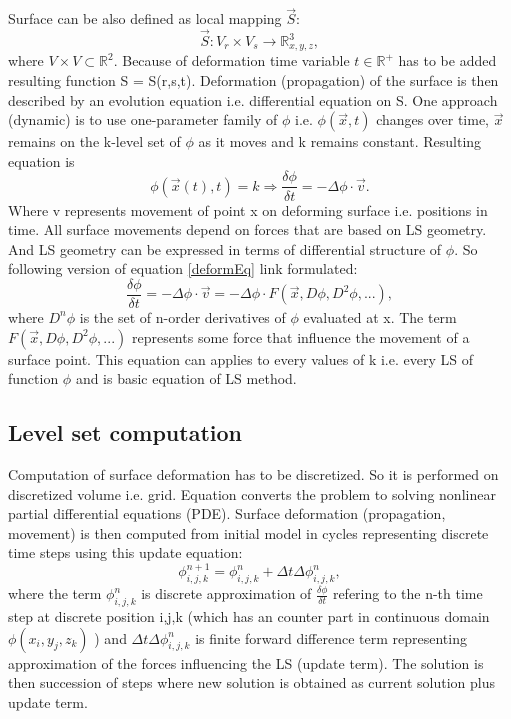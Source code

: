 Surface can be also defined as local mapping $\vec{S}$:
\begin{equation}
\vec{S}: V_r \times V_s \rightarrow \mathbb R^3_{x,y,z},
\end{equation}
where $V \times V \subset \mathbb R^2$. Because of deformation time variable $t\in \mathbb R^+$ has to be added resulting function S = S(r,s,t).
Deformation (propagation) of the surface is then described by an evolution equation i.e. differential equation on S.
One approach (dynamic) is to use one-parameter family of $\phi$ i.e. $\phi(\vec{x},t)$ changes over time, $\vec{x}$ remains on the k-level set of $\phi$ as it moves and k remains constant.
Resulting equation is
\begin{equation}
\label{deformEq}
\phi(\vec{x}(t),t) = k \Rightarrow \frac{\delta \phi}{\delta t} = - \Delta \phi
\cdot \vec{v}.
\end{equation}
Where v represents movement of point x on deforming surface i.e. positions in time.
All surface movements depend on forces that are based on LS geometry.
And LS geometry can be expressed in terms of differential structure of $\phi$.
So following version of equation \ref{deformEq} link formulated:
\begin{equation}
\frac{\delta\phi}{\delta t} = - \Delta \phi \cdot \vec{v} = - \Delta \phi
\cdot F(\vec{x}, D\phi, D^2\phi, ...),
\end{equation}
where $D^n\phi$ is the set of n-order derivatives of $\phi$ evaluated at x.
The term $F(\vec{x}, D\phi, D^2\phi, ...)$ represents some force that influence the movement of a surface point.
This equation can applies to every values of k i.e. every LS of function $\phi$ and is basic equation of LS method.

\subsection{Level set computation}

Computation of surface deformation has to be discretized. So it is performed on discretized volume i.e. grid.
Equation converts the problem to solving nonlinear partial differential equations (PDE).
Surface deformation (propagation, movement) is then computed from initial model in cycles representing discrete time steps using this update equation:
\begin{equation}
\label{deformEqApprox}
\phi_{i,j,k}^{n+1} = \phi_{i,j,k}^{n} + \Delta t \Delta \phi_{i,j,k}^{n},
\end{equation}
where the term $\phi_{i,j,k}^{n}$ is discrete approximation of $\frac{\delta\phi}{\delta t}$ refering to the n-th time step at discrete position i,j,k (which has an counter part in continuous domain $\phi(x_i, y_j, z_k)$ ) and $\Delta t \Delta \phi_{i,j,k}^{n}$ is finite forward difference term representing approximation of the forces influencing the LS (update term). The solution is then succession of steps where new solution is obtained as current solution plus update term.

